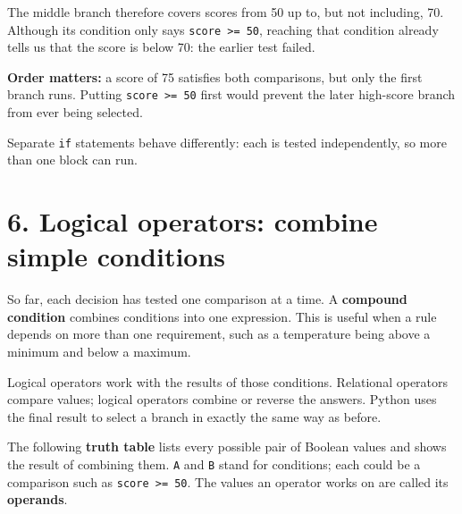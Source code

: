 \documentclass[12pt,a4paper]{article}
\begin{document}
The middle branch therefore covers scores from 50 up to, but not including, 70. Although its condition only says \texttt{score >= 50}, reaching that condition already tells us that the score is below 70: the earlier test failed.

\textbf{Order matters:} a score of 75 satisfies both comparisons, but only the first branch runs. Putting \texttt{score >= 50} first would prevent the later high-score branch from ever being selected.

Separate \texttt{if} statements behave differently: each is tested independently, so more than one block can run.

\section*{6. Logical operators: combine simple conditions}
So far, each decision has tested one comparison at a time. A \textbf{compound condition} combines conditions into one expression. This is useful when a rule depends on more than one requirement, such as a temperature being above a minimum and below a maximum.

Logical operators work with the results of those conditions. Relational operators compare values; logical operators combine or reverse the answers. Python uses the final result to select a branch in exactly the same way as before.

The following \textbf{truth table} lists every possible pair of Boolean values and shows the result of combining them. \texttt{A} and \texttt{B} stand for conditions; each could be a comparison such as \texttt{score >= 50}. The values an operator works on are called its \textbf{operands}.
\end{document}
